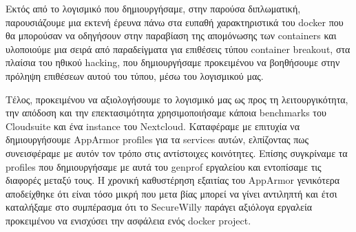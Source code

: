 Εκτός από το λογισμικό που δημιουργήσαμε, στην παρούσα διπλωματική, παρουσιάζουμε μια εκτενή έρευνα πάνω στα ευπαθή χαρακτηριστικά του \en docker\gr{} που θα μπορούσαν να οδηγήσουν στην παραβίαση της απομόνωσης των \en containers\gr{} και υλοποιούμε μια σειρά από παραδείγματα για επιθέσεις τύπου \en container breakout\gr{}, στα πλαίσια του ηθικού \en hacking\gr{}, που δημιουργήσαμε προκειμένου να βοηθήσουμε στην πρόληψη επιθέσεων αυτού του τύπου, μέσω του λογισμικού μας.

Τέλος, προκειμένου να αξιολογήσουμε το λογισμικό μας ως προς τη λειτουργικότητα, την απόδοση και την επεκτασιμότητα χρησιμοποιήσαμε κάποια \en benchmarks\gr{} του \en Cloudsuite\gr{} και ένα \en instance\gr{} του \en Nextcloud\gr{}. Καταφέραμε με επιτυχία να δημιουργήσουμε \en AppArmor profiles\gr{} για τα \en services\gr{} αυτών, ελπίζοντας πως συνεισφέραμε με αυτόν τον τρόπο στις αντίστοιχες κοινότητες. Επίσης συγκρίναμε τα \en profiles\gr{} που δημιουργήσαμε με αυτά του \en genprof\gr{} εργαλείου και εντοπίσαμε τις διαφορές μεταξύ τους. Η χρονική καθυστέρηση εξαιτίας του \en AppArmor\gr{} γενικότερα αποδείχθηκε ότι είναι τόσο μικρή που μετα βίας μπορεί να γίνει αντιληπτή και έτσι καταλήξαμε στο συμπέρασμα ότι το \en SecureWilly\gr{} παράγει αξιόλογα εργαλεία προκειμένου να ενισχύσει την ασφάλεια ενός \en docker project\gr{}.
\en
